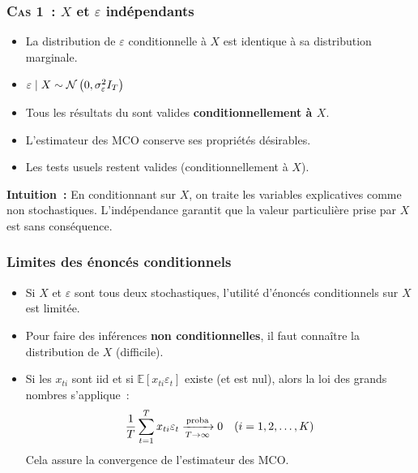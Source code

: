 \documentclass[10pt]{beamer}
\begin{document}
\begin{frame}
  \frametitle{\textsc{Cas 1~:} $X$ et $\varepsilon$ indépendants}

  \begin{itemize}

  \item La distribution de $\varepsilon$ conditionnelle à $X$ est identique à sa
    distribution marginale.\newline

  \item $\varepsilon \mid X \sim \mathcal N\left(0,\sigma_{\varepsilon}^2 I_T\right)$\newline

  \item Tous les résultats du  sont valides
    \textbf{conditionnellement à $X$}.\newline

  \item L'estimateur des MCO conserve ses propriétés désirables.\newline

  \item Les tests usuels restent valides (conditionnellement à $X$).\newline

  \end{itemize}

  \medskip

  \textbf{Intuition~:} En conditionnant sur $X$, on traite les variables
  explicatives comme non stochastiques. L'indépendance garantit que la valeur
  particulière prise par $X$ est sans conséquence.

\end{frame}


\begin{frame}
  \frametitle{Limites des énoncés conditionnels}

  \begin{itemize}

  \item Si $X$ et $\varepsilon$ sont tous deux stochastiques, l'utilité
    d'énoncés conditionnels sur $X$ est limitée.\newline

  \item Pour faire des inférences \textbf{non conditionnelles}, il faut
    connaître la distribution de $X$ (difficile).\newline

  \item Si les $x_{ti}$ sont iid et si $\mathbb E[x_{ti}\varepsilon_t]$ existe
    (et est nul), alors la loi des grands nombres s'applique~:
    \[
      \frac{1}{T}\sum_{t=1}^{T} x_{ti}\varepsilon_t \xrightarrow[T\rightarrow\infty]{\text{proba}} 0 \quad (i = 1, 2, \ldots, K)
    \]
    Cela assure la convergence de l'estimateur des MCO.\newline

  \end{itemize}


\end{frame}
\end{document}

